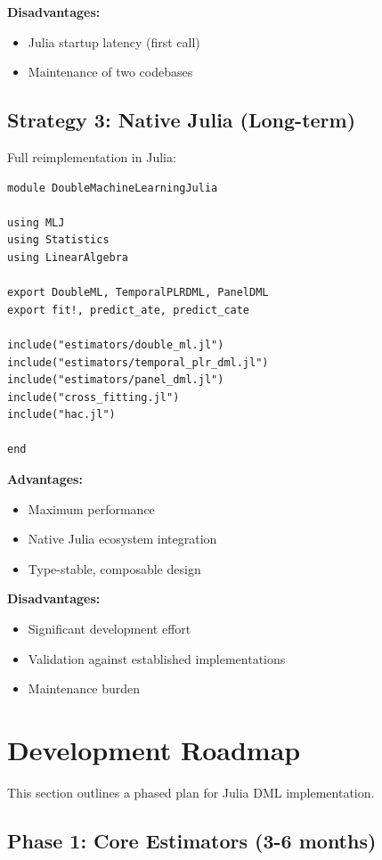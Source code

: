\textbf{Disadvantages:}
\begin{itemize}
    \item Julia startup latency (first call)
    \item Maintenance of two codebases
\end{itemize}

\subsection{Strategy 3: Native Julia (Long-term)}

Full reimplementation in Julia:

\begin{verbatim}
module DoubleMachineLearningJulia

using MLJ
using Statistics
using LinearAlgebra

export DoubleML, TemporalPLRDML, PanelDML
export fit!, predict_ate, predict_cate

include("estimators/double_ml.jl")
include("estimators/temporal_plr_dml.jl")
include("estimators/panel_dml.jl")
include("cross_fitting.jl")
include("hac.jl")

end
\end{verbatim}

\textbf{Advantages:}
\begin{itemize}
    \item Maximum performance
    \item Native Julia ecosystem integration
    \item Type-stable, composable design
\end{itemize}

\textbf{Disadvantages:}
\begin{itemize}
    \item Significant development effort
    \item Validation against established implementations
    \item Maintenance burden
\end{itemize}


\section{Development Roadmap}\label{sec:julia_roadmap}

This section outlines a phased plan for Julia DML implementation.

\subsection{Phase 1: Core Estimators (3-6 months)}


